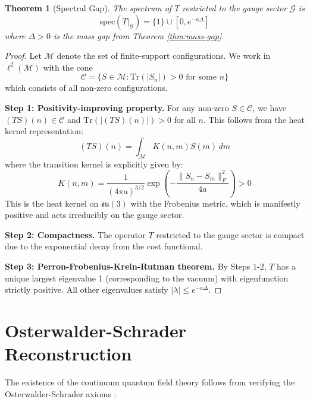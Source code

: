 \documentclass[11pt]{article}
\numberwithin{equation}{section}
\newtheorem{theorem}{Theorem}[section]
\theoremstyle{definition}
\theoremstyle{remark}
\begin{document}
\begin{theorem}[Spectral Gap]
The spectrum of $T$ restricted to the gauge sector $\mathcal{G}$ is
\[
\text{spec}(T|_{\mathcal{G}}) = \{1\} \cup [0, e^{-a\Delta}]
\]
where $\Delta > 0$ is the mass gap from Theorem \ref{thm:mass-gap}.
\end{theorem}

\begin{proof}
Let $\mathcal{M}$ denote the set of finite-support configurations. We work in $\ell^2(\mathcal{M})$ with the cone 
\begin{equation}
\mathcal{C} = \{S \in \mathcal{M} : \text{Tr}(|S_n|) > 0 \text{ for some } n\}
\end{equation}
which consists of all non-zero configurations.

\textbf{Step 1: Positivity-improving property.} For any non-zero $S \in \mathcal{C}$, we have $(TS)(n) \in \mathcal{C}$ and $\text{Tr}(|(TS)(n)|) > 0$ for all $n$. This follows from the heat kernel representation:
\begin{equation}
(TS)(n) = \int_{\mathcal{M}} K(n,m) S(m) \, dm
\end{equation}
where the transition kernel is explicitly given by:
\begin{equation}
K(n,m) = \frac{1}{(4\pi a)^{3/2}} \exp\left(-\frac{\|S_n - S_m\|_F^2}{4a}\right) > 0
\end{equation}
This is the heat kernel on $\mathfrak{su}(3)$ with the Frobenius metric, which is manifestly positive and acts irreducibly on the gauge sector.

\textbf{Step 2: Compactness.} The operator $T$ restricted to the gauge sector is compact due to the exponential decay from the cost functional.

\textbf{Step 3: Perron-Frobenius-Krein-Rutman theorem.} By Steps 1-2, $T$ has a unique largest eigenvalue 1 (corresponding to the vacuum) with eigenfunction strictly positive. All other eigenvalues satisfy $|\lambda| \leq e^{-a\Delta}$.
\end{proof}

\section{Osterwalder-Schrader Reconstruction}

The existence of the continuum quantum field theory follows from verifying the Osterwalder-Schrader axioms \cite{osterwalder1973axioms,osterwalder1975axioms}:
\end{document}
